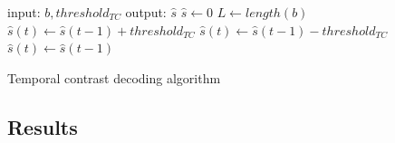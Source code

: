 	\begin{algorithm}
		\begin{algorithmic}[1]
				\STATE input: $b, threshold_{TC}$
				\STATE output: $\hat{s}$
				\STATE $\hat{s}\leftarrow 0$
				\STATE $L\leftarrow length(b)$
				\STATE $\hat{s}(t)\leftarrow \hat{s}(t-1)+threshold_{TC}$
				\STATE $\hat{s}(t)\leftarrow \hat{s}(t-1)-threshold_{TC}$
				\ELSE
				\STATE $\hat{s}(t)\leftarrow \hat{s}(t-1)$
				\ENDIF
				\ENDFOR
				\caption{Temporal contrast decoding algorithm}
				\label{alg:tc-dec}
		\end{algorithmic}
	\end{algorithm} 
\subsection{Results}


